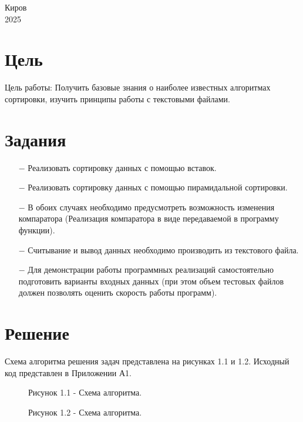 \documentclass[oneside,a4paper,14pt]{extarticle}
\begin{document}
\begin{center}
	Киров\\
	2025
\end{center}

\newpage\thispagestyle{plain}

\section*{Цель}

Цель работы: Получить базовые знания о наиболее известных алгоритмах сортировки, изучить принципы работы с текстовыми файлами.

\section*{Задания}
\begin{itemize}
	\item[$-$] Реализовать сортировку данных с помощью вставок.
	\item[$-$] Реализовать сортировку данных с помощью пирамидальной сортировки.
	\item[$-$] В обоих случаях необходимо предусмотреть возможность изменения компаратора (Реализация компаратора в виде передаваемой в программу функции).
	\item[$-$] Считывание и вывод данных необходимо производить из текстового файла.
	\item[$-$] Для демонстрации работы программных реализаций самостоятельно подготовить варианты входных данных (при этом объем тестовых файлов должен позволять оценить скорость работы программ).
\end{itemize}

\section*{Решение}

Схема алгоритма решения задач представлена на рисунках 1.1 и 1.2. Исходный код представлен в Приложении А1.

\newpage
\begin{figure}[!ht]
	\centering
	\caption*{Рисунок 1.1 - Схема алгоритма.}
\end{figure}

\begin{figure}[!ht]
	\centering
	\caption*{Рисунок 1.2 - Схема алгоритма.}
\end{figure}
\end{document}
